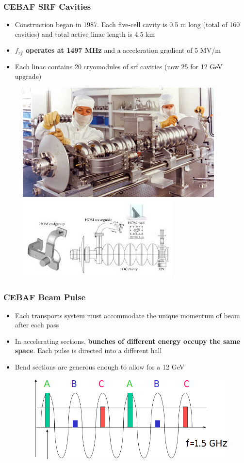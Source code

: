 \documentclass{beamer}
\begin{document}
\begin{frame}
\frametitle{CEBAF SRF Cavities}
\begin{itemize}
\item Construction began in 1987. Each five-cell cavity is 0.5 m long (total of 160 cavities) and total active linac length is 4.5 km
\item \textbf{$f_{rf}$ operates at 1497 MHz} and a acceleration gradient of 5 MV/m
\item Each linac contains 20 cryomodules of srf cavities (now 25 for 12 GeV upgrade)
\end{itemize}
\begin{figure}
\includegraphics[width=0.50\linewidth]{figs/srf_cavities.png}
\includegraphics[width=0.50\linewidth]{figs/srf_schematic.jpeg}
\end{figure}

\end{frame}


\begin{frame}
\frametitle{CEBAF Beam Pulse}
\begin{itemize}
\item Each transports system must accommodate the unique momentum of beam after each pass
\item In accelerating sections, \textbf{bunches of different energy occupy the same space}. Each pulse is directed into a different hall
\item Bend sections are generous enough to allow for a 12 GeV
\begin{figure}
\includegraphics[width=0.65\linewidth]{figs/beam_pulses.png}
\end{figure}
\end{itemize}
\end{frame}
\end{document}
